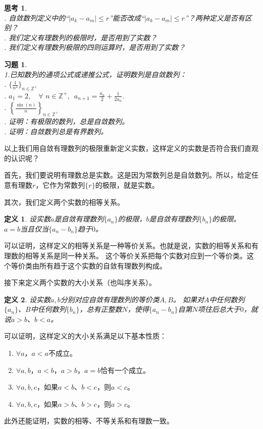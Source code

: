 \documentclass[12pt,UTF8]{ctexbook}
\newtheorem{df}{定义}[section]
\newtheorem{sk}{思考}[section]
\newtheorem{xt}{习题}[section]
\begin{document}
\begin{sk}
    \mbox{}\\
    . 自敛数列定义中的“$|a_k -a_m| \leqslant r$”能否改成“$|a_k -a_m| \leqslant r$”？两种定义是否有区别？\\
    . 我们定义有理数列的极限时，是否用到了实数？\\
    . 我们定义有理数列极限的四则运算时，是否用到了实数？
\end{sk}
\begin{xt}
    \mbox{}\\
    \indent 1.已知数列的通项公式或递推公式，证明数列是自敛数列：\\
    . $\{\frac{1}{n^2}\}_{n\in\mathbb{Z}^+}$\\
    . $a_1 = 2, \quad \forall \,\, n\in\mathbb{Z}^+, \,\,\, a_{n+1} = \frac{a_n}{2} + \frac{1}{2a_n}.$\\
    . $\left\{\frac{\sin(n)}{n}\right\}_{n\in\mathbb{Z}^+}$ \\
    . 证明：有极限的数列，总是自敛数列。\\
    . 证明：自敛数列总是有界数列。
\end{xt}

以上我们用自敛有理数列的极限重新定义实数，这样定义的实数是否符合我们直观的认识呢？

首先，我们要说明有理数总是实数。这是因为常数列总是自敛数列。所以，给定任意有理数$r$，它作为常数列$\{r\}$的极限，就是实数。

其次，我们定义两个实数的相等关系。
\begin{df}
    设实数$a$是自敛有理数列$\{a_n\}$的极限，$b$是自敛有理数列$\{b_n\}$的极限。
    $a = b$当且仅当$\{a_n - b_n\}$趋于$0$。
\end{df}
可以证明，这样定义的相等关系是一种等价关系。也就是说，实数的相等关系和有理数的相等关系是同一种关系。
这个等价关系把每个实数对应到一个等价类。这个等价类由所有趋于这个实数的自敛有理数列构成。

接下来定义两个实数的大小关系（也叫序关系）。
\begin{df}
    设实数$a,b$分别对应自敛有理数列的等价类$A,B$。
    如果对$A$中任何数列$\{a_n\}$、$B$中任何数列$\{b_n\}$，总有正整数$N$，使得$\{a_n - b_n\}$自第$N$项往后总大于$0$，就说$a>b$、$b<a$。
\end{df}
可以证明，这样定义的大小关系满足以下基本性质：
\begin{enumerate}
    \item $\forall a$，$a < a$不成立。
    \item $\forall a, b$，$a < b$，$a > b$，$a = b$恰有一个成立。
    \item $\forall a, b, c$，如果$a < b$、$b < c$，则$a < c$。
    \item $\forall a, b, c$，如果$a > b$、$b > c$，则$a > c$。
\end{enumerate}
此外还能证明，实数的相等、不等关系和有理数一致。
\end{document}
